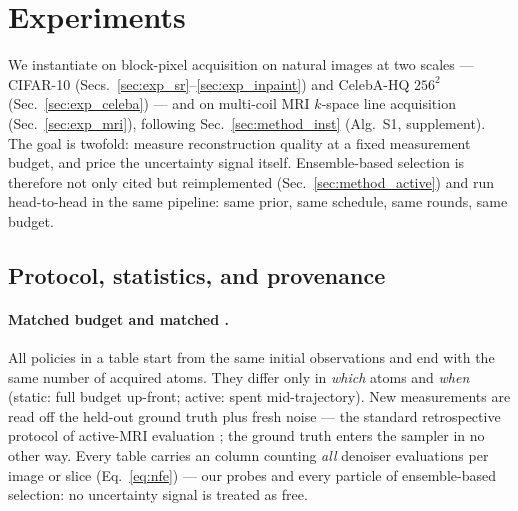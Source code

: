 \section{Experiments}\label{sec:exp}

We instantiate \pvas{} on block-pixel acquisition on natural images at
two scales --- CIFAR-10 (Secs.~\ref{sec:exp_sr}--\ref{sec:exp_inpaint})
and CelebA-HQ $256^2$ (Sec.~\ref{sec:exp_celeba}) --- and on multi-coil
MRI $k$-space line acquisition (Sec.~\ref{sec:exp_mri}), following
Sec.~\ref{sec:method_inst} (Alg.~S1, supplement). The goal is twofold:
measure reconstruction quality at a fixed measurement budget, and price
the uncertainty signal itself. Ensemble-based selection is therefore not
only cited but reimplemented (Sec.~\ref{sec:method_active}) and run
head-to-head in the same pipeline: same prior, same schedule, same
rounds, same budget.

\subsection{Protocol, statistics, and provenance}

\paragraph{Matched budget and matched \nfe.} All policies in a table
start from the same initial observations and end with the same number
of acquired atoms. They differ only in \emph{which} atoms and \emph{when}
(static: full budget up-front; active: spent mid-trajectory). New
measurements are read off the held-out ground truth plus fresh noise ---
the standard retrospective protocol of active-MRI evaluation
\cite{zhang2019active,bakker2020greedy}; the ground truth enters the
sampler in no other way. Every table carries an \nfe{} column counting
\emph{all} denoiser evaluations per image or slice (Eq.~\ref{eq:nfe})
--- our probes and every particle of ensemble-based selection: no
uncertainty signal is treated as free.

